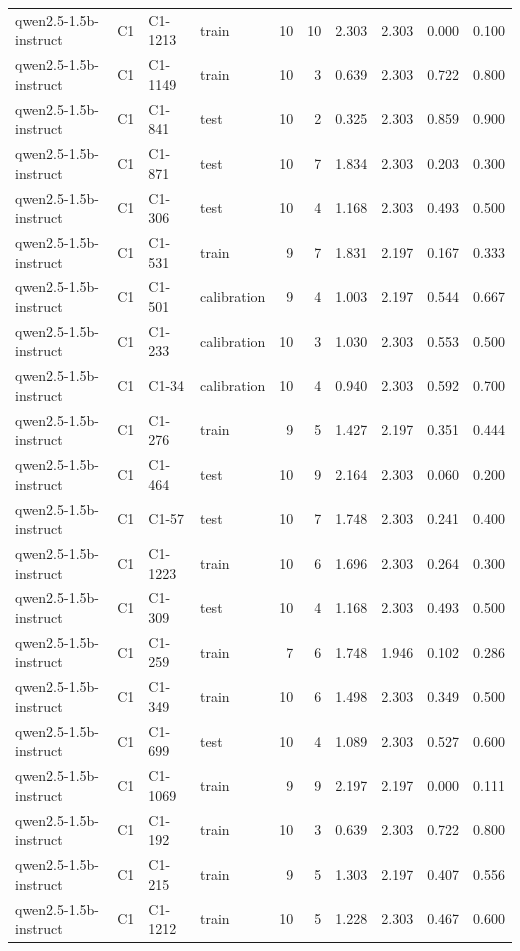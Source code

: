 \begin{table}
\begin{tabular}{llllrrrrrr}
qwen2.5-1.5b-instruct & C1 & C1-1213 & train & 10 & 10 & 2.303 & 2.303 & 0.000 & 0.100 \\
qwen2.5-1.5b-instruct & C1 & C1-1149 & train & 10 & 3 & 0.639 & 2.303 & 0.722 & 0.800 \\
qwen2.5-1.5b-instruct & C1 & C1-841 & test & 10 & 2 & 0.325 & 2.303 & 0.859 & 0.900 \\
qwen2.5-1.5b-instruct & C1 & C1-871 & test & 10 & 7 & 1.834 & 2.303 & 0.203 & 0.300 \\
qwen2.5-1.5b-instruct & C1 & C1-306 & test & 10 & 4 & 1.168 & 2.303 & 0.493 & 0.500 \\
qwen2.5-1.5b-instruct & C1 & C1-531 & train & 9 & 7 & 1.831 & 2.197 & 0.167 & 0.333 \\
qwen2.5-1.5b-instruct & C1 & C1-501 & calibration & 9 & 4 & 1.003 & 2.197 & 0.544 & 0.667 \\
qwen2.5-1.5b-instruct & C1 & C1-233 & calibration & 10 & 3 & 1.030 & 2.303 & 0.553 & 0.500 \\
qwen2.5-1.5b-instruct & C1 & C1-34 & calibration & 10 & 4 & 0.940 & 2.303 & 0.592 & 0.700 \\
qwen2.5-1.5b-instruct & C1 & C1-276 & train & 9 & 5 & 1.427 & 2.197 & 0.351 & 0.444 \\
qwen2.5-1.5b-instruct & C1 & C1-464 & test & 10 & 9 & 2.164 & 2.303 & 0.060 & 0.200 \\
qwen2.5-1.5b-instruct & C1 & C1-57 & test & 10 & 7 & 1.748 & 2.303 & 0.241 & 0.400 \\
qwen2.5-1.5b-instruct & C1 & C1-1223 & train & 10 & 6 & 1.696 & 2.303 & 0.264 & 0.300 \\
qwen2.5-1.5b-instruct & C1 & C1-309 & test & 10 & 4 & 1.168 & 2.303 & 0.493 & 0.500 \\
qwen2.5-1.5b-instruct & C1 & C1-259 & train & 7 & 6 & 1.748 & 1.946 & 0.102 & 0.286 \\
qwen2.5-1.5b-instruct & C1 & C1-349 & train & 10 & 6 & 1.498 & 2.303 & 0.349 & 0.500 \\
qwen2.5-1.5b-instruct & C1 & C1-699 & test & 10 & 4 & 1.089 & 2.303 & 0.527 & 0.600 \\
qwen2.5-1.5b-instruct & C1 & C1-1069 & train & 9 & 9 & 2.197 & 2.197 & 0.000 & 0.111 \\
qwen2.5-1.5b-instruct & C1 & C1-192 & train & 10 & 3 & 0.639 & 2.303 & 0.722 & 0.800 \\
qwen2.5-1.5b-instruct & C1 & C1-215 & train & 9 & 5 & 1.303 & 2.197 & 0.407 & 0.556 \\
qwen2.5-1.5b-instruct & C1 & C1-1212 & train & 10 & 5 & 1.228 & 2.303 & 0.467 & 0.600 \\

\end{tabular}
\end{table}
